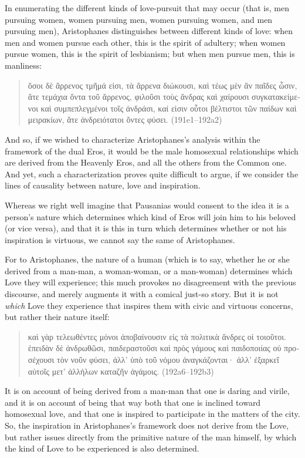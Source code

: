 In enumerating the different kinds of love-pursuit that may occur (that
is, men pursuing women, women pursuing men, women pursuing women, and
men pursuing men), Aristophanes distinguishes between different kinds of
love: when men and women pursue each other, this is the spirit of
adultery; when women pursue women, this is the spirit of lesbianism; but
when men pursue men, this is manliness:

\begin{quote}
\textgreek{ὅσοι δὲ ἄρρενος τμῆμά εἰσι, τὰ ἄρρενα διώκουσι, καὶ τέως
μὲν ἂν παῖδες ὦσιν, ἅτε τεμάχια ὄντα τοῦ ἄρρενος, φιλοῦσι τοὺς ἄνδρας
καὶ χαίρουσι συγκατακείμενοι καὶ συμπεπλεγμένοι τοῖς ἀνδράσι, καί
εἰσιν οὗτοι βέλτιστοι τῶν παίδων καὶ μειρακίων, ἅτε ἀνδρειότατοι ὄντες
φύσει.} (191e1--192a2)
\end{quote}

And so, if we wished to characterize Aristophanes's analysis within the
framework of the dual Eros, it would be the male homosexual
relationships which are derived from the Heavenly Eros, and all the
others from the Common one. And yet, such a characterization proves
quite difficult to argue, if we consider the lines of causality between
nature, love and inspiration.

Whereas we right well imagine that Pausanias would consent to the idea
it is a person's nature which determines which kind of Eros will join
him to his beloved (or vice versa), and that it is this in turn which
determines whether or not his inspiration is virtuous, we cannot say the
same of Aristophanes.

For to Aristophanes, the nature of a human (which is to say, whether he
or she derived from a man-man, a woman-woman, or a man-woman) determines
which Love they will experience; this much provokes no disagreement with
the previous discourse, and merely augments it with a comical just-so
story. But it is not \emph{which} Love they experience that inspires
them with civic and virtuous concerns, but rather their nature itself:

\begin{quote}
\textgreek{καὶ γὰρ τελεωθέντες μόνοι ἀποβαίνουσιν εἰς τὰ πολιτικὰ ἄνδρες οἱ
τοιοῦτοι. ἐπειδὰν δὲ ἀνδρωθῶσι, παιδεραστοῦσι καὶ πρὸς γάμους καὶ
παιδοποιίας οὐ προσέχουσι τὸν νοῦν φύσει, ἀλλ' ὑπὸ τοῦ νόμου
ἀναγκάζονται· ἀλλ' ἐξαρκεῖ αὐτοῖς μετ' ἀλλήλων καταζῆν ἀγάμοις.}
(192a6--192b3)
\end{quote}

It is on account of being derived from a man-man that one is daring and
virile, and it is on account of being that way both that one is inclined
toward homosexual love, and that one is inspired to participate in the
matters of the city. So, the inspiration in Aristophanes's framework
does not derive from the Love, but rather issues directly from the
primitive nature of the man himself, by which the kind of Love to be
experienced is also determined.

